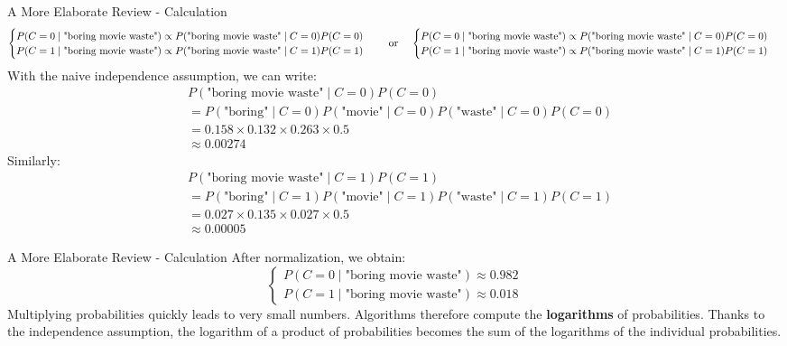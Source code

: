 \begin{frame}{A More Elaborate Review - Calculation}
	\begin{equation}
		\resizebox{1.0\textwidth}{!}{%
			$\begin{cases}
				P(C = 0 \mid \text{"boring movie waste"}) \propto P(\text{"boring movie waste"} \mid C = 0) P(C=0) \\
				P(C = 1 \mid \text{"boring movie waste"}) \propto P(\text{"boring movie waste"} \mid C = 1) P(C=1)
			\end{cases}$
		}
		\text{\quad or \quad}
		\resizebox{1.0\textwidth}{!}{%
			$\begin{cases}
				P(C = 0 \mid \text{"boring movie waste"}) \propto P(\text{"boring movie waste"} \mid C = 0) P(C=0) \\
				P(C = 1 \mid \text{"boring movie waste"}) \propto P(\text{"boring movie waste"} \mid C = 1) P(C=1)
			\end{cases}$
		}
		\nonumber
	\end{equation}
	\pause
	With the naive independence assumption, we can write:
	\begin{equation}
		\begin{aligned}
			&P(\text{"boring movie waste"} \mid C = 0) P(C=0) \\
			&= P(\text{"boring"} \mid C = 0) P(\text{"movie"} \mid C = 0) P(\text{"waste"} \mid C = 0) P(C=0) \\
			&= 0.158 \times 0.132 \times 0.263 \times 0.5 \\
			&\approx 0.00274 
		\end{aligned}
		\nonumber
	\end{equation}
	\pause
	Similarly:
	\begin{equation}
		\begin{aligned}
			&P(\text{"boring movie waste"} \mid C = 1) P(C=1) \\
			&= P(\text{"boring"} \mid C = 1) P(\text{"movie"} \mid C = 1) P(\text{"waste"} \mid C = 1) P(C=1) \\
			&= 0.027 \times 0.135 \times 0.027 \times 0.5 \\
			&\approx 0.00005
		\end{aligned}
		\nonumber
	\end{equation}
\end{frame}

\begin{frame}{A More Elaborate Review - Calculation}
	After normalization, we obtain:
	\begin{equation}
		\begin{cases}
			P(C = 0 \mid \text{"boring movie waste"}) \approx 0.982 \\
			P(C = 1 \mid \text{"boring movie waste"}) \approx 0.018
		\end{cases}
		\nonumber
	\end{equation}
	\pause
	Multiplying probabilities quickly leads to very small numbers. Algorithms therefore compute the \textbf{logarithms} of probabilities. Thanks to the independence assumption, the logarithm of a product of probabilities becomes the sum of the logarithms of the individual probabilities.
\end{frame}

